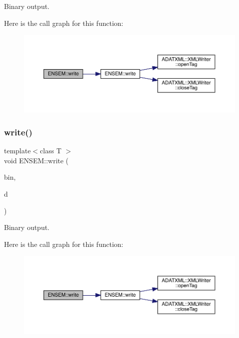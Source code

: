 Binary output. 

Here is the call graph for this function\+:\nopagebreak
\begin{figure}[H]
\begin{center}
\leavevmode
\includegraphics[width=350pt]{d2/d94/namespaceENSEM_a50d31b905b65f0286fa9c7204b5a6b19_cgraph}
\end{center}
\end{figure}
\mbox{\label{namespaceENSEM_aedacdfb4390e718c515314cad71d66ea}} 
\subsubsection{\texorpdfstring{write()}{write()}\hspace{0.1cm}{\footnotesize\ttfamily [8/13]}}
{\footnotesize\ttfamily template$<$class T $>$ \\
void E\+N\+S\+E\+M\+::write (\begin{DoxyParamCaption}\item[{\mbox{\hyperlink{classADATIO_1_1BinaryWriter}{A\+D\+A\+T\+I\+O\+::\+Binary\+Writer}} \&}]{bin,  }\item[{const \mbox{\hyperlink{classENSEM_1_1EScalar}{E\+Scalar}}$<$ \mbox{\hyperlink{classENSEM_1_1OTensor}{O\+Tensor}}$<$ T $>$ $>$ \&}]{d }\end{DoxyParamCaption})\hspace{0.3cm}{\ttfamily [inline]}}



Binary output. 

Here is the call graph for this function\+:\nopagebreak
\begin{figure}[H]
\begin{center}
\leavevmode
\includegraphics[width=350pt]{d2/d94/namespaceENSEM_aedacdfb4390e718c515314cad71d66ea_cgraph}
\end{center}
\end{figure}
\mbox{\label{namespaceENSEM_afee4cf5df7a009f056b6ea0bca81c639}} 
